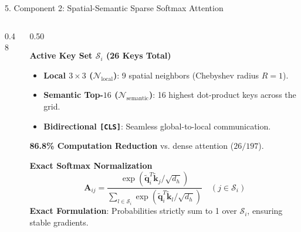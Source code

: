\documentclass[aspectratio=169,10pt]{beamer}
\begin{document}
\begin{frame}{5. Component 2: Spatial-Semantic Sparse Softmax Attention}
\begin{columns}[c]
\begin{column}{0.48\textwidth}
{%
        }
    \end{column}

    \begin{column}{0.50\textwidth}
        \begin{block}{\textbf{Active Key Set $\mathcal{S}_i$ (26 Keys Total)}}
            \small
            \begin{itemize}\setlength{\itemsep}{1.5pt}
                \item \textcolor{bordergreen}{\textbf{Local $3\times 3$ ($\mathcal{N}_{\text{local}}$)}}: 9 spatial neighbors (Chebyshev radius $R=1$).
                \item \textcolor{borderorange}{\textbf{Semantic Top-$16$ ($\mathcal{N}_{\text{semantic}}$)}}: 16 highest dot-product keys across the grid.
                \item \textcolor{borderpurple}{\textbf{Bidirectional \texttt{[CLS]}}}: Seamless global-to-local communication.
            \end{itemize}
            \centering \textbf{86.8\% Computation Reduction} vs. dense attention ($26 / 197$).
        \end{block}
        \vspace{-0.3em}
        \begin{exampleblock}{\textbf{Exact Softmax Normalization}}
            \small
            \vspace{-0.3em}
            \[ \mathbf{A}_{ij} = \frac{\exp(\tilde{\mathbf{q}}_i^T \tilde{\mathbf{k}}_j / \sqrt{d_h})}{\sum_{l \in \mathcal{S}_i} \exp(\tilde{\mathbf{q}}_i^T \tilde{\mathbf{k}}_l / \sqrt{d_h})} \quad (j \in \mathcal{S}_i) \]
            \vspace{-0.3em}
            \scriptsize \textbf{Exact Formulation}: Probabilities strictly sum to 1 over $\mathcal{S}_i$, ensuring stable gradients.
        \end{exampleblock}
    \end{column}
\end{columns}
\end{frame}
\end{document}
